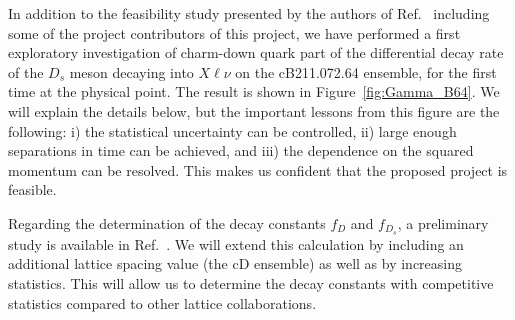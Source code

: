 In addition to the feasibility study presented by the authors of
Ref.~\cite{Gambino:2022dvu} including some of the project contributors of this
project, we have performed a first exploratory investigation of
charm-down quark part of the
differential decay rate of the $D_s$ meson decaying into $X\ell\nu$ on
the cB211.072.64 ensemble, for the first time at the physical
point. The result is shown in Figure~\ref{fig:Gamma_B64}. We will
explain the details below, but the important lessons from this figure
are the following: i) the statistical uncertainty can be controlled,
ii) large enough separations in time can be achieved, and iii) the
dependence on the squared momentum can be resolved. This makes us
confident that the proposed project is feasible.

Regarding the determination of the decay constants $f_{D}$ and
$f_{D_s}$, a preliminary study is available in
Ref.~\cite{Dimopoulos:2021qsf}. We will extend this calculation by
including an additional lattice spacing value (the cD
ensemble) as well as by increasing statistics. This will allow us to
determine the decay constants with competitive statistics compared to
other lattice collaborations.

\endinput
